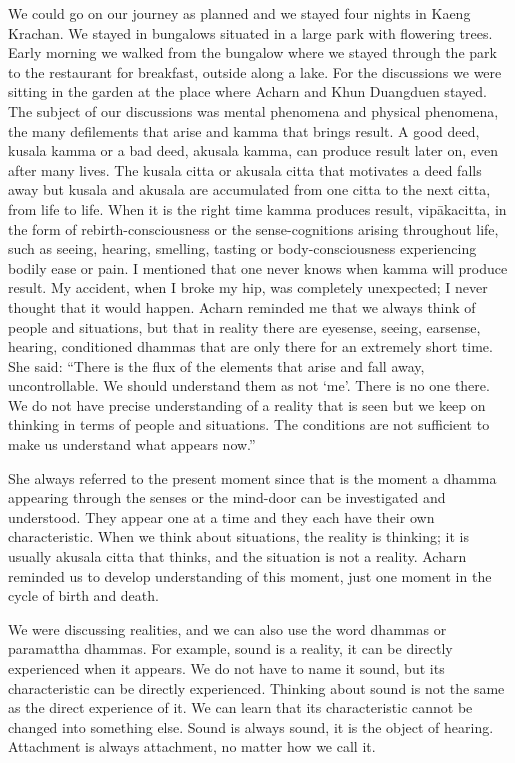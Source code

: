 We could go on our journey as planned and we stayed four nights in Kaeng
Krachan. We stayed in bungalows situated in a large park with flowering
trees. Early morning we walked from the bungalow where we stayed through
the park to the restaurant for breakfast, outside along a lake. For the
discussions we were sitting in the garden at the place where Acharn and
Khun Duangduen stayed. The subject of our discussions was mental
phenomena and physical phenomena, the many defilements that arise and
kamma that brings result. A good deed, kusala kamma or a bad deed,
akusala kamma, can produce result later on, even after many lives. The
kusala citta or akusala citta that motivates a deed falls away but
kusala and akusala are accumulated from one citta to the next citta,
from life to life. When it is the right time kamma produces result,
vipākacitta, in the form of rebirth-consciousness or the
sense-cognitions arising throughout life, such as seeing, hearing,
smelling, tasting or body-consciousness experiencing bodily ease or
pain. I mentioned that one never knows when kamma will produce result.
My accident, when I broke my hip, was completely unexpected; I never
thought that it would happen. Acharn reminded me that we always think of
people and situations, but that in reality there are eyesense, seeing,
earsense, hearing, conditioned dhammas that are only there for an
extremely short time. She said: ``There is the flux of the elements that
arise and fall away, uncontrollable. We should understand them as not
`me'. There is no one there. We do not have precise understanding of a
reality that is seen but we keep on thinking in terms of people and
situations. The conditions are not sufficient to make us understand what
appears now.''

She always referred to the present moment since that is the moment a
dhamma appearing through the senses or the mind-door can be investigated
and understood. They appear one at a time and they each have their own
characteristic. When we think about situations, the reality is thinking;
it is usually akusala citta that thinks, and the situation is not a
reality. Acharn reminded us to develop understanding of this moment,
just one moment in the cycle of birth and death.

We were discussing realities, and we can also use the word dhammas or
paramattha dhammas. For example, sound is a reality, it can be directly
experienced when it appears. We do not have to name it sound, but its
characteristic can be directly experienced. Thinking about sound is not
the same as the direct experience of it. We can learn that its
characteristic cannot be changed into something else. Sound is always
sound, it is the object of hearing. Attachment is always attachment, no
matter how we call it.

